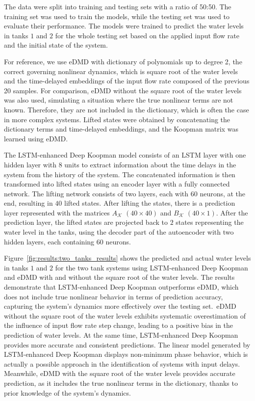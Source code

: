 \documentclass[conference]{IEEEtran}
\begin{document}
The data were split into training and testing sets with a ratio of 50:50. The training set was used to train the models, while the testing set was used to evaluate their performance. The models were trained to predict the water levels in tanks \(1\) and \(2\) for the whole testing set based on the applied input flow rate and the initial state of the system.

For reference, we use eDMD with dictionary of polynomials up to degree 2, the correct governing nonlinear dynamics, which is square root of the water levels and the time-delayed embeddings of the input flow rate composed of the previous 20 samples. For comparison, eDMD without the square root of the water levels was also used, simulating a situation where the true nonlinear terms are not known. Therefore, they are not included in the dictionary, which is often the case in more complex systems. Lifted states were obtained by concatenating the dictionary terms and time-delayed embeddings, and the Koopman matrix was learned using eDMD\@.

The LSTM-enhanced Deep Koopman model consists of an LSTM layer with one hidden layer with \(8\) units to extract information about the time delays in the system from the history of the system. The concatenated information is then transformed into lifted states using an encoder layer with a fully connected network. The lifting network consists of two layers, each with \(60\) neurons, at the end, resulting in \(40\) lifted states. After lifting the states, there is a prediction layer represented with the matrices \(A_\mathcal{K}\) \(\left(40 \times 40\right)\) and \(B_\mathcal{K}\) \(\left(40 \times 1\right)\). After the prediction layer, the lifted states are projected back to \(2\) states representing the water level in the tanks, using the decoder part of the autoencoder with two hidden layers, each containing \(60\) neurons.

Figure~\ref{fig:results:two_tanks_results} shows the predicted and actual water levels in tanks \(1\) and \(2\) for the two tank systems using LSTM-enhanced Deep Koopman and eDMD with and without the square root of the water levels. The results demonstrate that LSTM-enhanced Deep Koopman outperforms eDMD, which does not include true nonlinear behavior in terms of prediction accuracy, capturing the system's dynamics more effectively over the testing set.\ eDMD without the square root of the water levels exhibits systematic overestimation of the influence of input flow rate step change, leading to a positive bias in the prediction of water levels. At the same time, LSTM-enhanced Deep Koopman provides more accurate and consistent predictions. The linear model generated by LSTM-enhanced Deep Koopman displays non-minimum phase behavior, which is actually a possible approach in the identification of systems with input delays. Meanwhile, eDMD with the square root of the water levels provides accurate prediction, as it includes the true nonlinear terms in the dictionary, thanks to prior knowledge of the system's dynamics.
\end{document}
